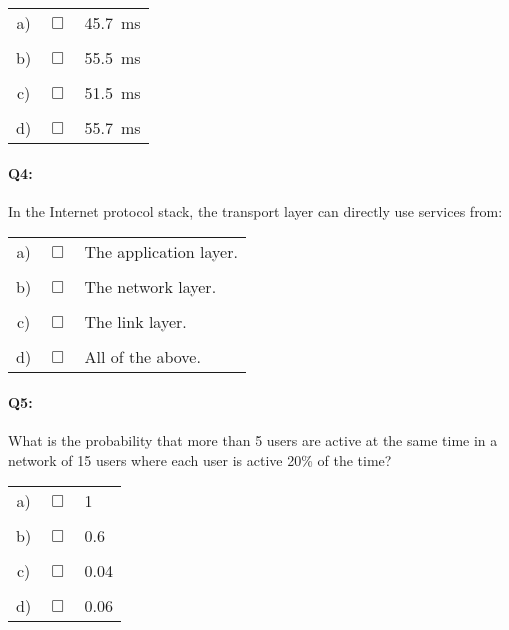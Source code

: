 \documentclass{llncs}
\newcommand{\answer}[1]{}%
\begin{document}
\begin{tabular}{ccl}
  a) & $\Box$ & 45.7~ms\\
  \\
  b) & $\Box$ & 55.5~ms \\
  \\
  c) & $\Box$ & 51.5~ms\\
  \\
  d) & $\Box$ & 55.7~ms
\end{tabular}


\answer{The propagation delay adds to the transmission time. The new delivery time is: $t_{A-X}+t_{X-B}+\frac{l_{A-X}}{s}+\frac{l_{X-B}}{s}$.
See slide 45 in Chapter 1. 
}

\paragraph{\textbf{Q4:}} In the Internet protocol stack, the transport layer can directly use services from:\\

\begin{tabular}{ccl}
  a) & $\Box$ & The application layer.\\
  \\
  b) & $\Box$ & The network layer.\\
  \\
  c) & $\Box$ & The link layer.\\
  \\
  d) & $\Box$ & All of the above.
\end{tabular}

\answer{In the layer model, a layer only uses services from the layer just below. See slide 58 in Chapter 1. }

\paragraph{\textbf{Q5:}} What is the probability that more than 5 users are active at the same time in a network of 15 users where each user is active 20\% of the time?\\

\begin{tabular}{ccl}
  a) & $\Box$ & 1\\
  \\
  b) & $\Box$ & 0.6\\
  \\
  c) & $\Box$ & 0.04\\
  \\
  d) & $\Box$ & 0.06
\end{tabular}
\end{document}
